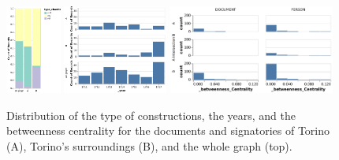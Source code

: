\begin{figure}[!ht]
    \centering



    \includegraphics[height=110px]{static/figures/ComBiNet/OriginalPaperFigures/CGF/TurinPlots/type+chantier.pdf}
    \includegraphics[height=110px]{static/figures/ComBiNet/OriginalPaperFigures/CGF/TurinPlots/time.pdf}
    \includegraphics[height=110px]{static/figures/ComBiNet/TorinoCompBC.pdf}

    \caption{Distribution of the type of constructions, the years, and the betweenness centrality for the documents and signatories of Torino (A), Torino's surroundings (B), and the whole graph (top).}\label{fig:attributeComparison}
\end{figure}


